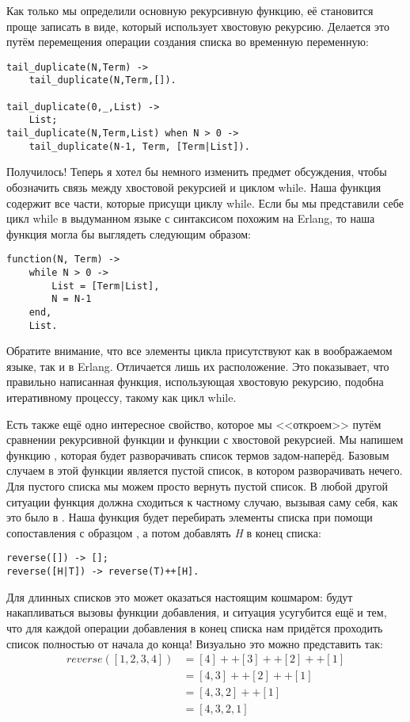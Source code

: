 Как только мы определили основную рекурсивную функцию, её становится проще записать в виде, который использует хвостовую рекурсию.
Делается это путём перемещения операции создания списка во временную переменную:
\begin{lstlisting}[style=erlang]
tail_duplicate(N,Term) ->
    tail_duplicate(N,Term,[]).
 
tail_duplicate(0,_,List) ->
    List;
tail_duplicate(N,Term,List) when N > 0 ->
    tail_duplicate(N-1, Term, [Term|List]).
\end{lstlisting}

Получилось!
Теперь я хотел бы немного изменить предмет обсуждения, чтобы обозначить связь между хвостовой рекурсией и циклом while.
Наша функция  содержит все части, которые присущи циклу while.
Если бы мы представили себе цикл while в выдуманном языке с синтаксисом похожим на Erlang, то наша функция могла бы выглядеть следующим образом:
\begin{lstlisting}[style=erlang]
function(N, Term) ->
    while N > 0 ->
        List = [Term|List],
        N = N-1
    end,
    List.
\end{lstlisting}

Обратите внимание, что все элементы цикла присутствуют как в воображаемом языке, так и в Erlang.
Отличается лишь их расположение.
Это показывает, что правильно написанная функция, использующая хвостовую рекурсию, подобна итеративному процессу, такому как цикл while.

Есть также ещё одно интересное свойство, которое мы <<откроем>> путём сравнении рекурсивной функции и функции с хвостовой рекурсией.
Мы напишем функцию , которая будет разворачивать список термов задом\--наперёд.
Базовым случаем в этой функции является пустой список, в котором разворачивать нечего.
Для пустого списка мы можем просто вернуть пустой список.
В любой другой ситуации функция должна сходиться к частному случаю, вызывая саму себя, как это было в .
Наша функция будет перебирать элементы списка при помощи сопоставления с образцом \ops{[H|T]}, а потом добавлять \emph{H} в конец списка:
\begin{lstlisting}[style=erlang]
reverse([]) -> [];
reverse([H|T]) -> reverse(T)++[H].
\end{lstlisting}

Для длинных списков это может оказаться настоящим кошмаром: будут накапливаться вызовы функции добавления, и ситуация усугубится ещё и тем, что для каждой операции добавления в конец списка нам придётся проходить список полностью от начала до конца!
Визуально это можно представить так:
\begin{align*}
reverse([1,2,3,4]) &= [4]++[3]++[2]++[1]\\
&= [4,3]++[2]++[1]\\
&= [4,3,2]++[1]\\
&= [4,3,2,1]\\
\end{align*}

